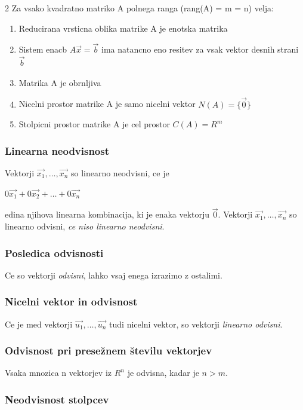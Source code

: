 \documentclass{article}
\begin{document}
\begin{multicols}{2}
	Za vsako kvadratno matriko A polnega ranga (rang(A) = m = n) velja:
	\begin{enumerate}
		\item Reducirana vrsticna oblika matrike A je enotska matrika
		\item Sistem enacb $A\vec{x} = \vec{b}$ ima natancno eno resitev za vsak vektor desnih strani $\vec{b}$
		\item Matrika A je obrnljiva
		\item Nicelni prostor matrike A je samo nicelni vektor $N(A) = \{\vec{0}\}$
		\item Stolpicni prostor matrike A je cel prostor $C(A) = R^{m}$
	\end{enumerate}

	\subsubsection{Linearna neodvisnost}

	Vektorji $\vec{x_{1}}, \dots,\vec{x_{n}}$ so linearno neodvisni, ce je
	\begin{center}
		$ 0\vec{x_{1}} + 0\vec{x_{2}} + \dots + 0\vec{x_{n}}$
	\end{center}
	edina njihova linearna kombinacija, ki je enaka vektorju $\vec{0}$. Vektorji $\vec{x_{1}}, \dots,\vec{x_{n}}$ so
	linearno odvisni, \textit{ce niso linearno neodvisni}.

	\subsubsection{Posledica odvisnosti}

	Ce so vektorji \textit{odvisni}, lahko vsaj enega izrazimo z ostalimi.

	\subsubsection{Nicelni vektor in odvisnost}

	Ce je med vektorji  $\vec{u_{1}}, \dots,\vec{u_{n}}$ tudi nicelni vektor, so
	vektorji \textit{linearno odvisni}.

	\subsubsection{Odvisnost pri presežnem številu vektorjev}

	Vsaka mnozica n vektorjev iz $R^{n}$ je odvisna, kadar je $n > m $.

	\subsubsection{Neodvisnost stolpcev}


\end{multicols}
\end{document}
